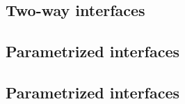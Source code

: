 \subsection{Two-way interfaces}

\subsection{Parametrized interfaces}

\subsection{Parametrized interfaces}











